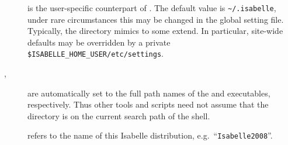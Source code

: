 \begin{isabellebody}
\begin{isamarkuptext}
\begin{description}
  \item[\hypertarget{setting.ISABELLE-HOME-USER}{\hyperlink{setting.ISABELLE-HOME-USER}{\mbox{}}}] is the user-specific
  counterpart of \hyperlink{setting.ISABELLE-HOME}{\mbox{}}. The default value is
  \verb|~/.isabelle|, under rare circumstances this may be
  changed in the global setting file.  Typically, the \hyperlink{setting.ISABELLE-HOME-USER}{\mbox{}} directory mimics \hyperlink{setting.ISABELLE-HOME}{\mbox{}} to
  some extend. In particular, site-wide defaults may be overridden by
  a private \verb|$ISABELLE_HOME_USER/etc/settings|.
  
  \item[\hypertarget{setting.ISABELLE-PROCESS}{\hyperlink{setting.ISABELLE-PROCESS}{\mbox{}}}\isa{{\isachardoublequote}\isactrlsup {\isacharasterisk}{\isachardoublequote}}, \hyperlink{setting.ISABELLE-TOOL}{\mbox{}}\isa{{\isachardoublequote}\isactrlsup {\isacharasterisk}{\isachardoublequote}}] are automatically set to the full path
  names of the \hyperlink{executable.isabelle-process}{\mbox{}} and \hyperlink{executable.isabelle}{\mbox{}} executables, respectively.  Thus other tools and scripts
  need not assume that the \hyperlink{file.$ISABELLE-HOME/bin}{\mbox{}} directory is
  on the current search path of the shell.
  
  \item[\hypertarget{setting.ISABELLE-IDENTIFIER}{\hyperlink{setting.ISABELLE-IDENTIFIER}{\mbox{}}}\isa{{\isachardoublequote}\isactrlsup {\isacharasterisk}{\isachardoublequote}}] refers
  to the name of this Isabelle distribution, e.g.\ ``\verb|Isabelle2008|''.


\end{description}
\end{isamarkuptext}
\end{isabellebody}

